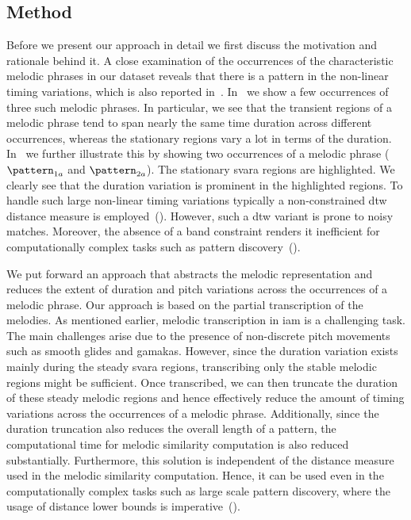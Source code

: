 

\subsection{Method}
\label{sec:patterns_improving_similarity_method}

Before we present our approach in detail we first discuss the motivation and rationale behind it. A close examination of the occurrences of the characteristic melodic phrases in our dataset reveals that there is a pattern in the non-linear timing variations, which is also reported in~\cite{Rao2014}. In~ we show a few occurrences of three such melodic phrases. In particular, we see that the transient regions of a melodic phrase tend to span nearly the same time duration across different occurrences, whereas the stationary regions vary a lot in terms of the duration. In~ we further illustrate this by showing two occurrences of a melodic phrase ($\pattern_{1a}$ and $\pattern_{2a}$). The stationary \gls{svara} regions are highlighted. We clearly see that the duration variation is prominent in the highlighted regions. To handle such large non-linear timing variations typically a non-constrained \gls{dtw} distance measure is employed~(). However, such a \gls{dtw} variant is prone to noisy matches. Moreover, the absence of a band constraint renders it inefficient for computationally complex tasks such as pattern discovery~().

We put forward an approach that abstracts the melodic representation and reduces the extent of duration and pitch variations across the occurrences of a melodic phrase. Our approach is based on the partial transcription of the melodies.  As mentioned earlier, melodic transcription in \gls{iam} is a challenging task. The main challenges arise due to the presence of non-discrete pitch movements such as smooth glides and \glspl{gamaka}. However, since the duration variation exists mainly during the steady \gls{svara} regions, transcribing only the stable melodic regions might be sufficient. Once transcribed, we can then truncate the duration of these steady melodic regions and hence effectively reduce the amount of timing variations across the occurrences of a melodic phrase. Additionally, since the duration truncation also reduces the overall length of a pattern, the computational time for melodic similarity computation is also reduced substantially. Furthermore, this solution is independent of the distance measure used in the melodic similarity computation. Hence, it can be used even in the computationally complex tasks such as large scale pattern discovery, where the usage of distance lower bounds is imperative~().

